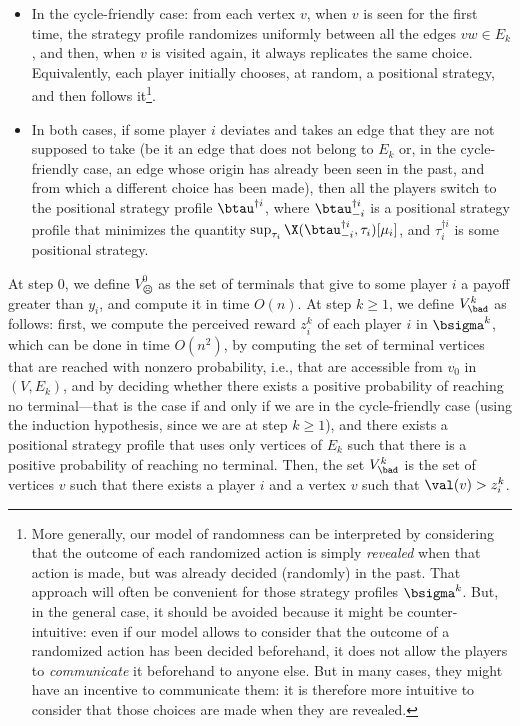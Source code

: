 \begin{itemize}
\begin{itemize}
            \item In the cycle-friendly case: from each vertex $v$, when $v$ is seen for the first time, the strategy profile randomizes uniformly between all the edges $vw \in E_k$, and then, when $v$ is visited again, it always replicates the same choice.
            Equivalently, each player initially chooses, at random, a positional strategy, and then follows it\footnote{More generally, our model of randomness can be interpreted by considering that the outcome of each randomized action is simply \emph{revealed} when that action is made, but was already decided (randomly) in the past.
            That approach will often be convenient for those strategy profiles $\bsigma^k$.
            But, in the general case, it should be avoided because it might be counter-intuitive: even if our model allows to consider that the outcome of a randomized action has been decided beforehand, it does not allow the players to \emph{communicate} it beforehand to anyone else.
            But in many cases, they might have an incentive to communicate them: it is therefore more intuitive to consider that those choices are made when they are revealed.}.
            \item  In both cases, if some player $i$ deviates and takes an edge that they are not supposed to take (be it an edge that does not belong to $E_k$ or, in the cycle-friendly case, an edge whose origin has already been seen in the past, and from which a different choice has been made), then all the players switch to the positional strategy profile $\btau^{\dag i}$, where $\btau^{\dag i}_{-i}$ is a positional strategy profile that minimizes the quantity $\sup_{\tau_i} \X({\btau^{\dag i}_{-i}, \tau_i})[\mu_i]$, and $\tau^{\dag i}_i$ is some positional strategy.
        \end{itemize}
       
                
        At step $0$, we define $V_{\frownie}^0$ as the set of terminals that give to some player $i$ a payoff greater than $y_i$, and compute it in time $O(n)$.
        At step $k \geq 1$, we define $V_\bad^k$ as follows: first, we compute the perceived reward $z^k_i$ of each player $i$ in $\bsigma^k$, which can be done in time $O(n^2)$, by computing the set of terminal vertices that are reached with nonzero probability, i.e., that are accessible from $v_0$ in $(V, E_k)$, and by deciding whether there exists a positive probability of reaching no terminal---that is the case if and only if we are in the cycle-friendly case (using the induction hypothesis, since we are at step $k \geq 1$), and there exists a positional strategy profile that uses only vertices of $E_k$ such that there is a positive probability of reaching no terminal.
        Then, the set $V_\bad^k$ is the set of vertices $v$ such that there exists a player $i$ and a vertex $v$ such that $\val(v) > z^k_i$.
        

\end{itemize}
